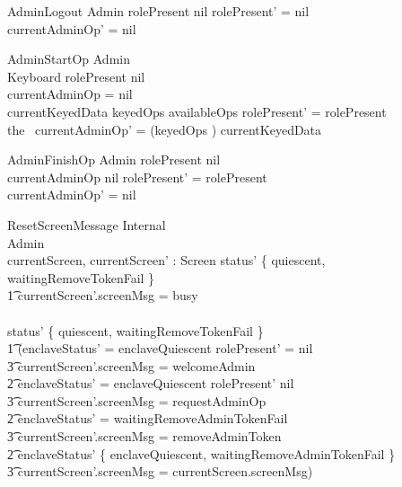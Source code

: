 \begin{schema}{AdminLogout}
        \Delta Admin
\where
        rolePresent \neq nil
\also
        rolePresent' = nil
\\      currentAdminOp' = nil
\end{schema}

\begin{schema}{AdminStartOp}
        \Delta Admin
\\      Keyboard
\where
        rolePresent \neq nil
\\      currentAdminOp = nil
\\      currentKeyedData \in keyedOps \limg availableOps \rimg
\also
        rolePresent' = rolePresent
\\      the~ currentAdminOp' = (keyedOps \inv) currentKeyedData
\end{schema}

\begin{schema}{AdminFinishOp}
        \Delta Admin
\where
        rolePresent \neq nil
\\      currentAdminOp \neq nil
\also
        rolePresent' = rolePresent
\\      currentAdminOp' = nil 
\end{schema}

\begin{schema}{ResetScreenMessage}
        \Delta Internal
\\      \Delta Admin
\\      currentScreen, currentScreen' : Screen
\where
        status' \notin \{ quiescent, waitingRemoveTokenFail \} 
\\ \t1 \land currentScreen'.screenMsg = busy
\\      \lor
\\      status' \in \{ quiescent, waitingRemoveTokenFail \}
\\ \t1 \land (enclaveStatus' = enclaveQuiescent \land rolePresent' = nil 
\\ \t3          \land currentScreen'.screenMsg = welcomeAdmin
\\ \t2 \lor enclaveStatus' = enclaveQuiescent \land rolePresent' \neq nil 
\\ \t3          \land currentScreen'.screenMsg = requestAdminOp
\\ \t2 \lor enclaveStatus' = waitingRemoveAdminTokenFail 
\\ \t3          \land currentScreen'.screenMsg = removeAdminToken
\\ \t2 \lor enclaveStatus' \notin 
        \{ enclaveQuiescent, waitingRemoveAdminTokenFail \} 
\\ \t3          \land currentScreen'.screenMsg = currentScreen.screenMsg)
\end{schema}

